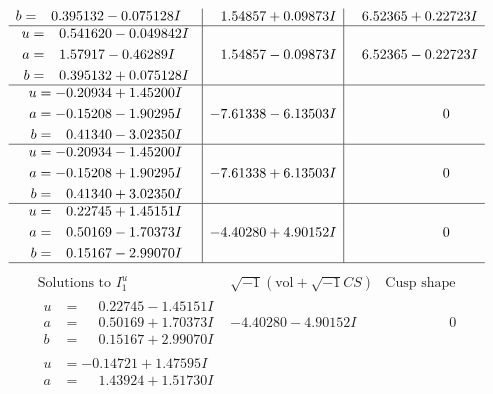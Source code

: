 \documentclass[1p]{elsarticle_modified}
\theoremstyle{definition}
\newcommand{\I}{\sqrt{-1}}
\begin{document}
$$\begin{array}{c|c|c}
\begin{aligned}
b &= \phantom{-}0.395132 - 0.075128 I\end{aligned}
 & \phantom{-}1.54857 + 0.09873 I & \phantom{-}6.52365 + 0.22723 I \\ \hline\begin{aligned}
u &= \phantom{-}0.541620 - 0.049842 I \\
a &= \phantom{-}1.57917 - 0.46289 I \\
b &= \phantom{-}0.395132 + 0.075128 I\end{aligned}
 & \phantom{-}1.54857 - 0.09873 I & \phantom{-}6.52365 - 0.22723 I \\ \hline\begin{aligned}
u &= -0.20934 + 1.45200 I \\
a &= -0.15208 - 1.90295 I \\
b &= \phantom{-}0.41340 - 3.02350 I\end{aligned}
 & -7.61338 - 6.13503 I & \phantom{-0.000000 } 0 \\ \hline\begin{aligned}
u &= -0.20934 - 1.45200 I \\
a &= -0.15208 + 1.90295 I \\
b &= \phantom{-}0.41340 + 3.02350 I\end{aligned}
 & -7.61338 + 6.13503 I & \phantom{-0.000000 } 0 \\ \hline\begin{aligned}
u &= \phantom{-}0.22745 + 1.45151 I \\
a &= \phantom{-}0.50169 - 1.70373 I \\
b &= \phantom{-}0.15167 - 2.99070 I\end{aligned}
 & -4.40280 + 4.90152 I & \phantom{-0.000000 } 0\\
 \hline 
 \end{array}$$\newpage$$\begin{array}{c|c|c}  
\text{Solutions to }I^u_{1}& \I (\text{vol} + \sqrt{-1}CS) & \text{Cusp shape}\\
 \hline 
\begin{aligned}
u &= \phantom{-}0.22745 - 1.45151 I \\
a &= \phantom{-}0.50169 + 1.70373 I \\
b &= \phantom{-}0.15167 + 2.99070 I\end{aligned}
 & -4.40280 - 4.90152 I & \phantom{-0.000000 } 0 \\ \hline\begin{aligned}
u &= -0.14721 + 1.47595 I \\
a &= \phantom{-}1.43924 + 1.51730 I \\

\end{aligned}
\end{array}$$
\end{document}
